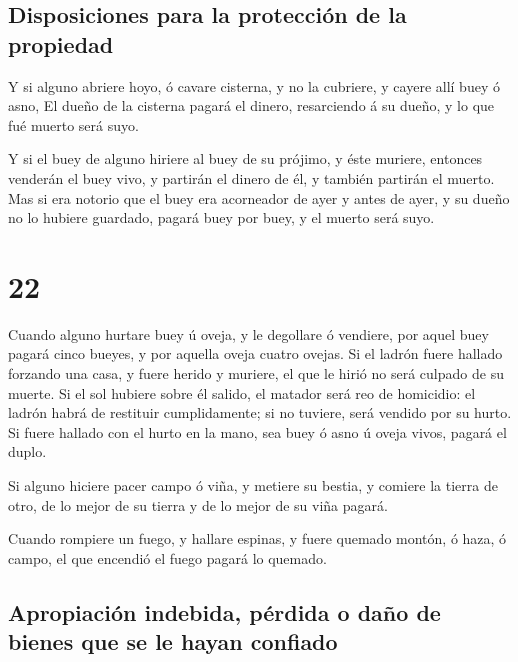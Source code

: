\hypertarget{disposiciones-para-la-protecciuxf3n-de-la-propiedad}{%
\subsection{Disposiciones para la protección de la
propiedad}\label{disposiciones-para-la-protecciuxf3n-de-la-propiedad}}

 Y si alguno abriere hoyo, ó cavare cisterna, y no la
cubriere, y cayere allí buey ó asno,  El dueño de la
cisterna pagará el dinero, resarciendo á su dueño, y lo que fué muerto
será suyo.

 Y si el buey de alguno hiriere al buey de su prójimo, y
éste muriere, entonces venderán el buey vivo, y partirán el dinero de
él, y también partirán el muerto.  Mas si era notorio que
el buey era acorneador de ayer y antes de ayer, y su dueño no lo hubiere
guardado, pagará buey por buey, y el muerto será suyo.

\hypertarget{section-21}{%
\section{22}\label{section-21}}

 Cuando alguno hurtare buey ú oveja, y le degollare ó
vendiere, por aquel buey pagará cinco bueyes, y por aquella oveja cuatro
ovejas.  Si el ladrón fuere hallado forzando una casa, y
fuere herido y muriere, el que le hirió no será culpado de su muerte.
 Si el sol hubiere sobre él salido, el matador será reo de
homicidio: el ladrón habrá de restituir cumplidamente; si no tuviere,
será vendido por su hurto.  Si fuere hallado con el hurto
en la mano, sea buey ó asno ú oveja vivos, pagará el duplo.

 Si alguno hiciere pacer campo ó viña, y metiere su
bestia, y comiere la tierra de otro, de lo mejor de su tierra y de lo
mejor de su viña pagará.

 Cuando rompiere un fuego, y hallare espinas, y fuere
quemado montón, ó haza, ó campo, el que encendió el fuego pagará lo
quemado.

\hypertarget{apropiaciuxf3n-indebida-puxe9rdida-o-dauxf1o-de-bienes-que-se-le-hayan-confiado}{%
\subsection{Apropiación indebida, pérdida o daño de bienes que se le
hayan
confiado}\label{apropiaciuxf3n-indebida-puxe9rdida-o-dauxf1o-de-bienes-que-se-le-hayan-confiado}}

